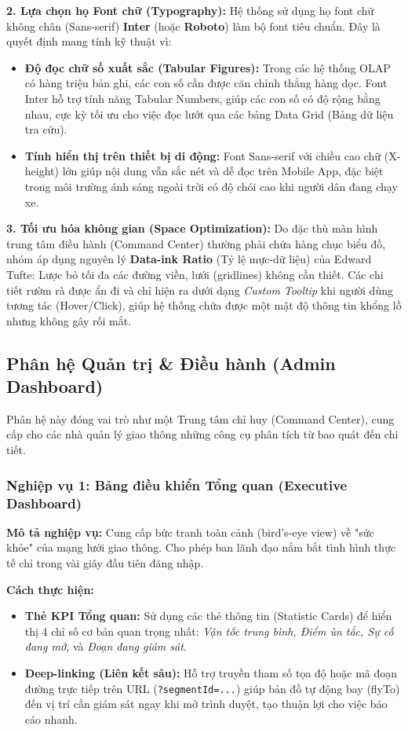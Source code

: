 \textbf{2. Lựa chọn họ Font chữ (Typography):}
Hệ thống sử dụng họ font chữ không chân (Sans-serif) \textbf{Inter} (hoặc \textbf{Roboto}) làm bộ font tiêu chuẩn. Đây là quyết định mang tính kỹ thuật vì:
\begin{itemize}
    \item \textbf{Độ đọc chữ số xuất sắc (Tabular Figures):} Trong các hệ thống OLAP có hàng triệu bản ghi, các con số cần được căn chỉnh thẳng hàng dọc. Font Inter hỗ trợ tính năng Tabular Numbers, giúp các con số có độ rộng bằng nhau, cực kỳ tối ưu cho việc đọc lướt qua các bảng Data Grid (Bảng dữ liệu tra cứu).
    \item \textbf{Tính hiển thị trên thiết bị di động:} Font Sans-serif với chiều cao chữ (X-height) lớn giúp nội dung vẫn sắc nét và dễ đọc trên Mobile App, đặc biệt trong môi trường ánh sáng ngoài trời có độ chói cao khi người dân đang chạy xe.
\end{itemize}

\textbf{3. Tối ưu hóa không gian (Space Optimization):}
Do đặc thù màn hình trung tâm điều hành (Command Center) thường phải chứa hàng chục biểu đồ, nhóm áp dụng nguyên lý \textbf{Data-ink Ratio} (Tỷ lệ mực-dữ liệu) của Edward Tufte: Lược bỏ tối đa các đường viền, lưới (gridlines) không cần thiết. Các chi tiết rườm rà được ẩn đi và chỉ hiện ra dưới dạng \textit{Custom Tooltip} khi người dùng tương tác (Hover/Click), giúp hệ thống chứa được một mật độ thông tin khổng lồ nhưng không gây rối mắt.



\subsection{Phân hệ Quản trị \& Điều hành (Admin Dashboard)}

Phân hệ này đóng vai trò như một Trung tâm chỉ huy (Command Center), cung cấp cho các nhà quản lý giao thông những công cụ phân tích từ bao quát đến chi tiết.

\subsubsection{Nghiệp vụ 1: Bảng điều khiển Tổng quan (Executive Dashboard)}

\textbf{Mô tả nghiệp vụ:} Cung cấp bức tranh toàn cảnh (bird's-eye view) về "sức khỏe" của mạng lưới giao thông. Cho phép ban lãnh đạo nắm bắt tình hình thực tế chỉ trong vài giây đầu tiên đăng nhập.

\textbf{Cách thực hiện:}
\begin{itemize}
    \item \textbf{Thẻ KPI Tổng quan:} Sử dụng các thẻ thông tin (Statistic Cards) để hiển thị 4 chỉ số cơ bản quan trọng nhất: \textit{Vận tốc trung bình, Điểm ùn tắc, Sự cố đang mở,} và \textit{Đoạn đang giám sát}.
    \item \textbf{Deep-linking (Liên kết sâu):} Hỗ trợ truyền tham số tọa độ hoặc mã đoạn đường trực tiếp trên URL (\texttt{?segmentId=...}) giúp bản đồ tự động bay (flyTo) đến vị trí cần giám sát ngay khi mở trình duyệt, tạo thuận lợi cho việc báo cáo nhanh.
\end{itemize}

